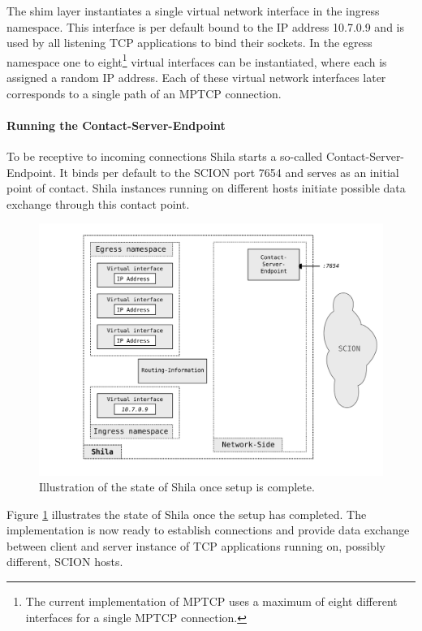 The shim layer instantiates a single virtual network interface in the ingress namespace. This interface is per default bound to the IP address 10.7.0.9 and is used by all listening TCP applications to bind their sockets. In the egress namespace one to eight\footnote{The current implementation of MPTCP uses a maximum of eight different interfaces for a single MPTCP connection.} virtual interfaces can be instantiated, where each is assigned a random IP address. Each of these virtual network interfaces later corresponds to a single path of an MPTCP connection.

\paragraph{Running the Contact-Server-Endpoint} To be receptive to incoming connections Shila starts a so-called Contact-Server-Endpoint. It binds per default to the SCION port 7654 and serves as an initial point of contact. Shila instances running on different hosts initiate possible data exchange through this contact point.

\begin{figure}
	\begin{center}
		\def\svgwidth{1\textwidth}
		\includegraphics[scale=0.2]{../illustrations/shilaIntroduction/StateAfterSetup.pdf}   
		\caption[Caption for the list of figures.]{Illustration of the state of Shila once setup is complete.}
		\label{fig:ShilaIllustrationStateAfterSetup}
	\end{center}
\end{figure}

Figure \ref{fig:ShilaIllustrationStateAfterSetup} illustrates the state of Shila once the setup has completed. The implementation is now ready to establish connections and provide data exchange between client and server instance of TCP applications running on, possibly different, SCION hosts. 


